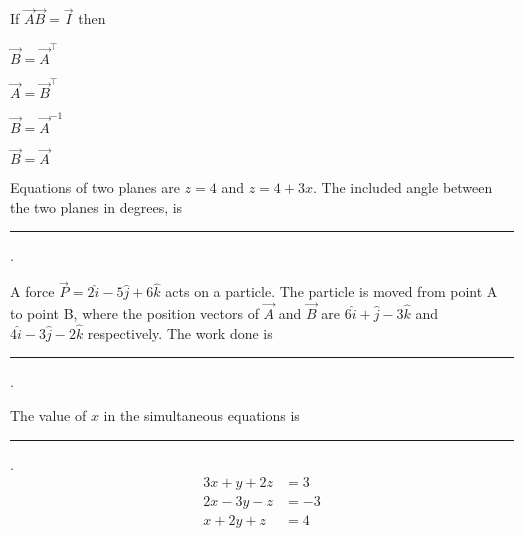 \item If $\vec{A}\vec{B} = \vec{I}$ then
  \hfill{}
  \begin{enumerate}
\begin{multicols}{4}
      \item $\vec{B} = \vec{A}^{\top}$
      \item $\vec{A} = \vec{B}^{\top}$
      \item $\vec{B} = \vec{A}^{-1}$
      \item $\vec{B} = \vec{A}$
    \end{multicols}
  \end{enumerate}
\item Equations of two planes are $z = 4$ and $z = 4 + 3x$. The included angle between the two planes in degrees, is \rule{1cm}{0.01pt}.
\hfill{}

\item A force $\vec{P} = 2\hat{i} - 5\hat{j} + 6\hat{k}$ acts on a particle. The particle is moved from point A to point B, where the position vectors of $\vec{A}$ and $\vec{B}$ are $6\hat{i} + \hat{j} - 3\hat{k}$ and $4\hat{i} - 3\hat{j} - 2\hat{k}$ respectively. The work done is \rule{1cm}{0.01pt}.
\hfill{}
\item The value of $x$ in the simultaneous equations is \rule{1cm}{0.01pt}.
\hfill{}
\begin{align*}
3x + y + 2z &= 3 \\
2x - 3y - z &= -3 \\
x + 2y + z &= 4
\end{align*}


